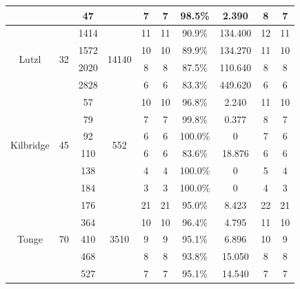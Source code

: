 \begin{table}[h!]
\begin{center}
{\begin{tabular}{c|c|c|c|c|c|c|c|c|c}
				\cline{3-3}
				\cline{5-10}
				& & 47 & & 7& 7& 98.5\% & 2.390 &8 & 7\\
				\hline
				\multirow{4}{*}{Lutzl} & \multirow{4}{*}{32} & 1414 & \multirow{4}{*}{14140} & 11 & 11 & 90.9\% & 134.400 & 12 & 11\\
				\cline{3-3}
				\cline{5-10}
				& & 1572 & & 10& 10& 89.9\% & 134.270 &11 & 10\\
				\cline{3-3}
				\cline{5-10}
				& & 2020 & & 8& 8& 87.5\% & 110.640 &8 & 8\\
				\cline{3-3}
				\cline{5-10}
				& & 2828 & & 6& 6& 83.3\% & 449.620 &6 & 6\\
				\hline
				\multirow{6}{*}{Kilbridge} & \multirow{6}{*}{45} & 57 & \multirow{6}{*}{552} & 10 & 10 & 96.8\% & 2.240 & 11 & 10\\
				\cline{3-3}
				\cline{5-10}
				& & 79 & & 7& 7& 99.8\% & 0.377 &8 & 7\\
				\cline{3-3}
				\cline{5-10}
				& & 92 & & 6& 6& 100.0\% & 0 &7 & 6\\
				\cline{3-3}
				\cline{5-10}
				& & 110 & & 6& 6& 83.6\% & 18.876 &6 & 6\\
				\cline{3-3}
				\cline{5-10}
				& & 138 & & 4& 4& 100.0\% & 0 &5 & 4\\
				\cline{3-3}
				\cline{5-10}
				& & 184 & & 3& 3& 100.0\% & 0 &4 & 3\\
				\hline
				\multirow{5}{*}{Tonge} & \multirow{5}{*}{70} & 176 & \multirow{5}{*}{3510} & 21 & 21 & 95.0\% & 8.423 & 22 & 21\\
				\cline{3-3}
				\cline{5-10}
				& & 364 & & 10& 10& 96.4\% & 4.795 &11 & 10\\
				\cline{3-3}
				\cline{5-10}
				& & 410 & & 9& 9& 95.1\% & 6.896 &10 & 9\\
				\cline{3-3}
				\cline{5-10}
				& & 468 & & 8& 8& 93.8\% & 15.050 &8 & 8\\
				\cline{3-3}
				\cline{5-10}
				& & 527 & & 7& 7& 95.1\% & 14.540 &7 & 7\\
				\hline
		\end{tabular}}
	\end{center}	
\end{table}